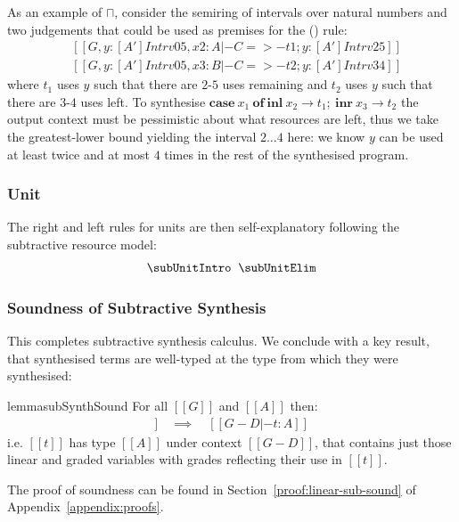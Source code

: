 As an example of $\sqcap$, consider the semiring of intervals over natural numbers and two
judgements that could be used as premises for the (\subSumElimName) rule:
%
\begin{align*}
& [[ G, y : [A'] Intrv 0 5, x2 : A |- C =>- t1 ; y : [A'] Intrv 2 5 ]] \\
& [[ G, y : [A'] Intrv 0 5, x3 : B |- C =>- t2 ; y : [A'] Intrv 3 4 ]]
\end{align*}
%
where $t_1$ uses $y$ such that there are $2$-$5$ uses remaining
and $t_2$ uses $y$ such that there are $3$-$4$
uses left. To synthesise $\textbf{case} \ x_{1}\ \textbf{of}\ \textbf{inl}\ x_{2} \rightarrow t_{1};\ \textbf{inr}\ x_{3} \rightarrow t_{2}$
the output context must be pessimistic about what resources are left,
thus we take the greatest-lower bound yielding the interval $
2\dots4 $ here: we know $y$ can be used at least twice and at most
$4$ times in the rest of the synthesised program.

\subsubsection{Unit}
The right and left rules for units are then
self-explanatory following the subtractive resource model:
%
\begin{align*}
\begin{array}{c}
  \subUnitIntro
  \;\;
  \subUnitElim
\end{array}
\end{align*}

%

\subsubsection{Soundness of Subtractive Synthesis}
This completes subtractive synthesis calculus. We conclude
with a key result, that synthesised terms are well-typed at the type from which they
were synthesised:
\label{soundness-ref}
%
\begin{restatable}{lemma}{subSynthSound}
\label{lemma:subSynthSound}
For all $[[ G ]]$ and $[[ A ]]$
then:
\begin{align*}
[[ G |- A =>- t ; D ]] \quad \implies \quad [[ G - D |- t : A ]]
\end{align*}
i.e. $[[ t ]]$ has type $[[ A ]]$
under context $[[ G - D ]]$,
that contains just those linear and
graded variables with grades reflecting their use in $[[ t ]]$.
\end{restatable}
The proof of soundness can be found in Section~\ref{proof:linear-sub-sound} of Appendix~\ref{appendix:proofs}. 


